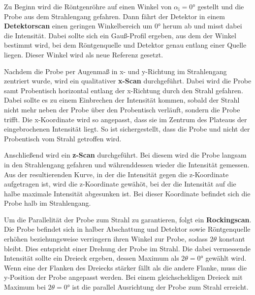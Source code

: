         \FloatBarrier
  

        Zu Beginn wird die Röntgenröhre auf einen Winkel von $\alpha_{\text{i}} = 0°$ gestellt und die Probe aus dem Strahlengang gefahren. Dann fährt der Detektor in einem \textbf{Detektorscan} einen geringen 
        Winkelbereich um 0° herum ab und misst dabei die Intensität. Dabei sollte sich ein Gauß-Profil ergeben, aus dem der Winkel bestimmt wird, bei dem Röntgenquelle und Detektor genau entlang einer Quelle 
        liegen. Dieser Winkel wird als neue Referenz gesetzt.\newline
        
        Nachdem die Probe per Augenmaß in x- und y-Richtung im Strahlengang zentriert wurde, wird ein qualitativer \textbf{x-Scan} durchgeführt. Dabei wird die Probe samt Probentisch horizontal entlang der 
        x-Richtung durch den Strahl gefahren. Dabei sollte es zu einem Einbrechen der Intensität kommen, sobald der Strahl nicht mehr neben der Probe über den Probentisch verläuft, sondern die Probe trifft. 
        Die x-Koordinate wird so angepasst, dass sie im Zentrum des Plateaus der eingebrochenen Intensität liegt. So ist sichergestellt, dass die Probe und nicht der Probentisch vom Strahl getroffen wird.
        
        Anschließend wird ein \textbf{z-Scan} durchgeführt. Bei diesem wird die Probe langsam in den Strahlengang 
        gefahren und währenddessen wieder die Intensität gemessen. Aus der resultierenden Kurve, in der die Intensität gegen die z-Koordinate aufgetragen ist, wird die z-Koordinate gewähöt, bei der die Intensität
        auf die halbe maximale Intensität abgesunken ist. Bei dieser Koordinate befindet sich die Probe halb im Strahlengang.\newline
        
        Um die Parallelität der Probe zum Strahl zu garantieren, folgt ein \textbf{Rockingscan}. Die Probe befindet sich in halber Abschattung und Detektor sowie Röntgenquelle erhöhen beziehungsweise verringern 
        ihren Winkel zur Probe, sodass $2\theta$ konstant bleibt. Dies entspricht einer Drehung der Probe im Strahl. Die dabei vermessende Intensität sollte ein Dreieck ergeben, dessen Maximum als $2\theta=0°$
        gewählt wird. Wenn eine der Flanken des Dreiecks stärker fällt als die andere Flanke, muss die y-Position der Probe angepasst werden. Bei einem gleichschekligen Dreieck mit Maximum bei $2\theta=0°$ ist
        die parallel Ausrichtung der Probe zum Strahl erreicht.\newline

